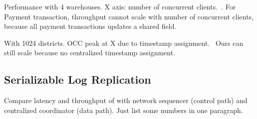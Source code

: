 Performance with 4 warehouses.
X axis: number of concurrent clients.~\cite{yu2014staring}.
For Payment transaction, throughput cannot scale with number of concurrent clients, because all payment transactions updates a shared field.

With 1024 districts.
OCC peak at X due to timestamp assignment.~\cite{yu2014staring} Ours can still scale because no centralized timestamp assignment.

\subsection{Serializable Log Replication}
\label{subsec:eval-replication}

Compare latency and throughput of \sys with network sequencer (control path) and centralized coordinator (data path).
Just list some numbers in one paragraph.







